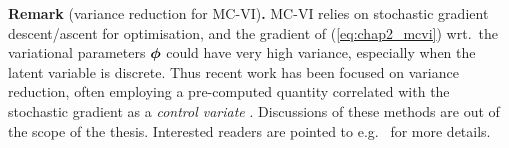 \vspace{1em}
\begin{tcolorbox}
\textbf{Remark} (variance reduction for MC-VI)\textbf{.}
MC-VI relies on stochastic gradient descent/ascent for optimisation, and the gradient of (\ref{eq:chap2_mcvi}) wrt.~the variational parameters $\bm{\phi}$ could have very high variance, especially when the latent variable is discrete. Thus recent work has been focused on variance reduction, often employing a pre-computed quantity correlated with the stochastic gradient as a \emph{control variate} \citep{ross:book2002}. Discussions of these methods are out of the scope of the thesis. Interested readers are pointed to e.g.~\citet{paisley:bbvi2012, mnih:nvil2014, gu:muprop2016} for more details.

\end{tcolorbox}
